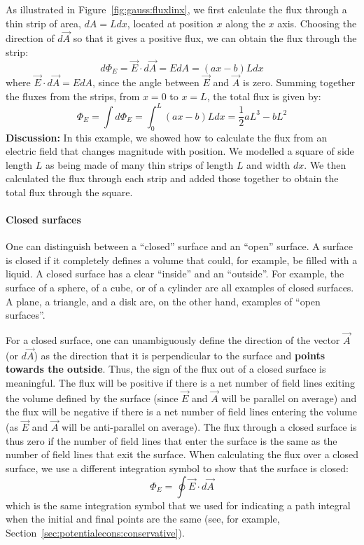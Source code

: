 \begin{framed}
\begin{framed}
As illustrated in Figure~\ref{fig:gauss:fluxlinx}, we first calculate the flux through a thin strip of area, $dA=Ldx$, located at position $x$ along the $x$ axis. Choosing the direction of $d\vec A$ so that it gives a positive flux, we can obtain the flux through the strip:
\begin{equation}
d\Phi_E=\vec E\cdot d\vec A=EdA=(ax-b)Ldx
\end{equation}
where $\vec E\cdot d\vec A=EdA$, since the angle between $\vec E$ and $\vec A$ is zero. Summing together the fluxes from the strips, from $x=0$ to $x=L$, the total flux is given by:
\begin{equation}
\Phi_E=\int d\Phi_E=\int_0^L(ax-b)Ldx=\frac{1}{2}aL^3-bL^2
\end{equation}
\textbf{Discussion:} In this example, we showed how to calculate the flux from an electric field that changes magnitude with position. We modelled a square of side length $L$ as being made of many thin strips of length $L$ and width $dx$. We then calculated the flux through each strip and added those together to obtain the total flux through the square.
\end{framed}
\end{framed}

\paragraph{Closed surfaces}\label{sec:gauss:closedsurfaces}

One can distinguish between a ``closed'' surface and an ``open'' surface. A surface is closed if it completely defines a volume that could, for example, be filled with a liquid.  A closed surface has a clear ``inside'' and an ``outside''. For example, the surface of a sphere, of a cube, or of a cylinder are all examples of closed surfaces. A plane, a triangle, and a disk are, on the other hand, examples of ``open surfaces''.

For a closed surface, one can unambiguously define the direction of the vector $\vec A$ (or $d\vec A$) as the direction that it is perpendicular to the surface and \textbf{points towards the outside}. Thus, the sign of the flux out of a closed surface is meaningful. The flux will be positive if there is a net number of field lines exiting the volume defined by the surface (since $\vec E$ and $\vec A$ will be parallel on average) and the flux will be negative if there is a net number of field lines entering the volume (as $\vec E$ and $\vec A$ will be anti-parallel on average). The flux through a closed surface is thus zero if the number of field lines that enter the surface is the same as the number of field lines that exit the surface. When calculating the flux over a closed surface, we use a different integration symbol to show that the surface is closed:
\begin{equation}
\Phi_E=\oint \vec E\cdot d\vec A
\end{equation}
which is the same integration symbol that we used for indicating a path integral when the initial and final points are the same (see, for example, Section~\ref{sec:potentialecons:conservative}).

